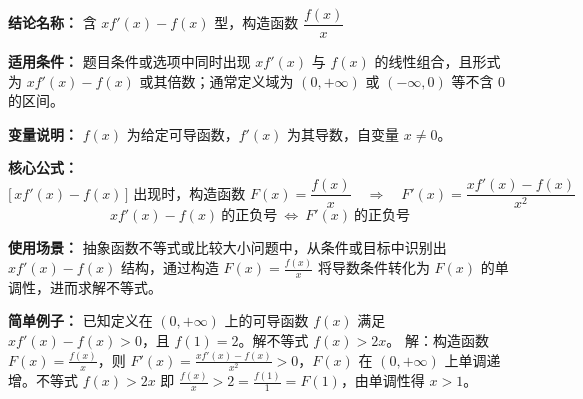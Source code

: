 \textbf{结论名称：} 含 \( x f'(x)-f(x) \) 型，构造函数 \( \dfrac{f(x)}{x} \)

\textbf{适用条件：} 题目条件或选项中同时出现 \( x f'(x) \) 与 \( f(x) \) 的线性组合，且形式为 \( x f'(x)-f(x) \) 或其倍数；通常定义域为 \( (0,+\infty) \) 或 \( (-\infty,0) \) 等不含 \( 0 \) 的区间。

\textbf{变量说明：} \( f(x) \) 为给定可导函数，\( f'(x) \) 为其导数，自变量 \( x \neq 0 \)。

\textbf{核心公式：} 
\[
\bigl[\, x f'(x)-f(x) \,\bigr] \text{ 出现时，构造函数 } F(x)=\frac{f(x)}{x} \quad 
\Rightarrow \quad F'(x)=\frac{x f'(x)-f(x)}{x^{2}}
\]
\[
\boxed{ x f'(x)-f(x) \ \text{的正负号} \ \Longleftrightarrow \ F'(x) \ \text{的正负号} }
\]

\textbf{使用场景：} 抽象函数不等式或比较大小问题中，从条件或目标中识别出 \( x f'(x)-f(x) \) 结构，通过构造 \( F(x)=\frac{f(x)}{x} \) 将导数条件转化为 \( F(x) \) 的单调性，进而求解不等式。

\textbf{简单例子：} 
已知定义在 \( (0,+\infty) \) 上的可导函数 \( f(x) \) 满足 \( x f'(x)-f(x)>0 \)，且 \( f(1)=2 \)。解不等式 \( f(x)>2x \)。
解：构造函数 \( F(x)=\frac{f(x)}{x} \)，则 \( F'(x)=\frac{x f'(x)-f(x)}{x^{2}}>0 \)，\( F(x) \) 在 \( (0,+\infty) \) 上单调递增。不等式 \( f(x)>2x \) 即 \( \frac{f(x)}{x}>2 = \frac{f(1)}{1}=F(1) \)，由单调性得 \( x>1 \)。